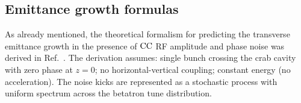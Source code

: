 \subsection{Emittance growth formulas}\label{subsec:CC_emit_growth_theoretical_formulas}
As already mentioned, the theoretical formalism for predicting the transverse emittance growth in the presence of ${\mathrm{CC}}$ RF amplitude and phase noise was derived in Ref.~\cite{PhysRevSTAB.18.101001}. The derivation assumes: single bunch crossing the crab cavity with zero phase at $z=0$; no horizontal-vertical coupling; constant energy (no acceleration). The noise kicks are represented as a stochastic process with uniform spectrum across the betatron tune distribution.


